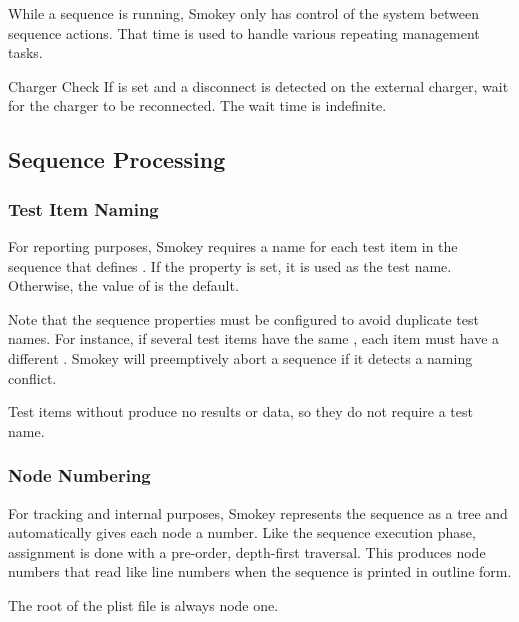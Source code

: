 While a sequence is running, Smokey only has control of the system between
sequence actions.  That time is used to handle various repeating management
tasks.

\begin{Descriptive}

	\item[Charger Check] If  is set and a disconnect is
	detected on the external charger, wait for the charger to be
	reconnected.  The wait time is indefinite.

\end{Descriptive}

\subsection{Sequence Processing}

\subsubsection{Test Item Naming}
\label{subsec:TestItemNaming}

For reporting purposes, Smokey requires a name for each test item in the
sequence that defines .  If the  property
is set, it is used as the test name.  Otherwise, the value of
 is the default.

Note that the sequence properties must be configured to avoid duplicate test
names.  For instance, if several test items have the same
, each item must have a different .
Smokey will preemptively abort a sequence if it detects a naming conflict.

Test items without  produce no results or data, so they
do not require a test name.

\subsubsection{Node Numbering}

For tracking and internal purposes, Smokey represents the sequence as a tree
and automatically gives each node a number.  Like the sequence execution phase,
assignment is done with a pre-order, depth-first traversal.  This produces node
numbers that read like line numbers when the sequence is printed in outline
form.

The root of the plist file is always node one.

